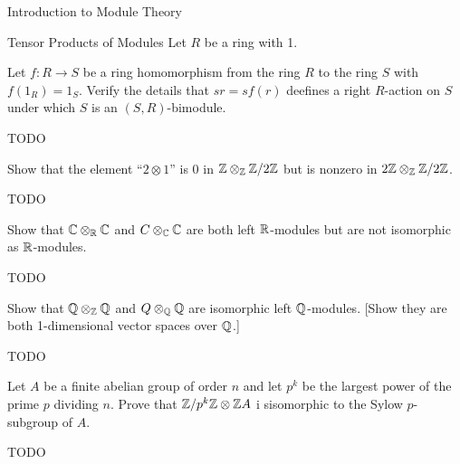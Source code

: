 \begin{chapter}{Introduction to Module Theory}
\begin{section}{Tensor Products of Modules}
Let $R$ be a ring with 1. 
\begin{problem}\label{ex:10.4.1}
Let $f:R\to S$ be a ring homomorphism from the ring $R$ to the ring $S$ with $f(1_R) = 1_S$. Verify the details that $sr = sf(r)$ deefines a right $R$-action on $S$ under which $S$ is an $(S,R)$-bimodule. 
\end{problem}
\begin{solution}TODO

\end{solution}\oneperpage



\begin{problem}\label{ex:10.4.2}
Show that the element ``$2\otimes 1$'' is $0$ in $\mathbb{Z}\otimes_{\mathbb{Z}} \mathbb{Z}/2\mathbb{Z}$ but is nonzero in $2\mathbb{Z}\otimes_{\mathbb{Z}} \mathbb{Z}/2\mathbb{Z}$. 
\end{problem}
\begin{solution}TODO

\end{solution}\oneperpage



\begin{problem}\label{ex:10.4.3}
Show that $\mathbb{C}\otimes_{\mathbb{R}}\mathbb{C}$ and $C\otimes _{\mathbb{C}}\mathbb{C}$ are both left $\mathbb{R}$-modules but are not isomorphic as $\mathbb{R}$-modules.
\end{problem}
\begin{solution}TODO

\end{solution}\oneperpage



\begin{problem}\label{ex:10.4.4}
Show that $\mathbb{Q}\otimes_{\mathbb{Z}}\mathbb{Q}$ and $Q\otimes_{\mathbb{Q}}\mathbb{Q}$ are isomorphic left $\mathbb{Q}$-modules. [Show they are both 1-dimensional vector spaces over $\mathbb{Q}$.]
\end{problem}
\begin{solution}TODO

\end{solution}\oneperpage



\begin{problem}\label{ex:10.4.5}
Let $A$ be a finite abelian group of order $n$ and let $p^k$ be the largest power of the prime $p$ dividing $n$. Prove that $\mathbb{Z}/p^k\mathbb{Z}\otimes \mathbb{Z} A$ i sisomorphic to the Sylow $p$-subgroup of $A$. 
\end{problem}
\begin{solution}TODO


\end{solution}
\end{section}
\end{chapter}
